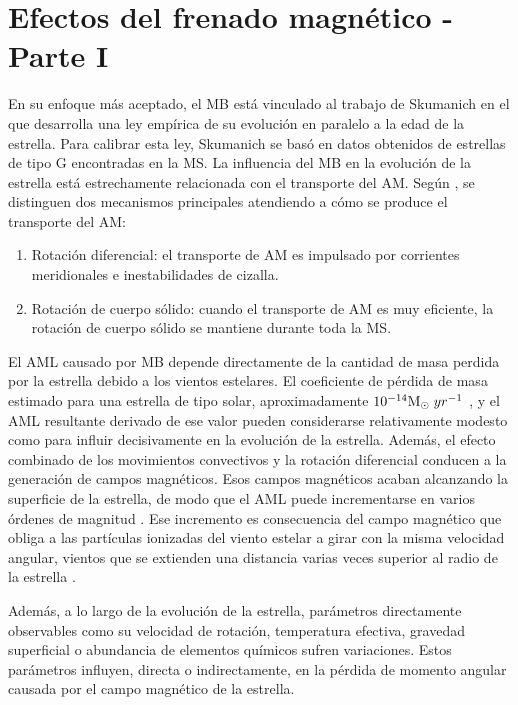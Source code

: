 \section{Efectos del frenado magnético - Parte I}
En su enfoque más aceptado, el MB está vinculado al trabajo de Skumanich \citep{Skumanich1972} en el que desarrolla una ley empírica de su evolución en paralelo a la edad de la estrella. Para calibrar esta ley, Skumanich se basó en datos obtenidos de estrellas de tipo G encontradas en la MS. La influencia del MB en la evolución de la estrella está estrechamente relacionada con el transporte del AM. Según \cite{Meynet2010}, se distinguen dos mecanismos principales atendiendo a cómo se produce el transporte del AM:

\begin{enumerate}
    \item Rotación diferencial: el transporte de AM es impulsado por corrientes meridionales e inestabilidades de cizalla.
    \item Rotación de cuerpo sólido: cuando el transporte de AM es muy eficiente, la rotación de cuerpo sólido se mantiene durante toda la MS.
\end{enumerate}

El AML causado por MB depende directamente de la cantidad de masa perdida por la estrella debido a los vientos estelares. El coeficiente de pérdida de masa estimado para una estrella de tipo solar, aproximadamente $10^{-14}\mathrm{M}_\odot \; yr^{-1}$ \citep{Noerdlinger2008}, y el AML resultante derivado de ese valor pueden considerarse relativamente modesto como para influir decisivamente en la evolución de la estrella. Además, el efecto combinado de los movimientos convectivos y la rotación diferencial conducen a la generación de campos magnéticos. Esos campos magnéticos acaban alcanzando la superficie de la estrella, de modo que el AML puede incrementarse en varios órdenes de magnitud \citep{Langer2012}. Ese incremento es consecuencia del campo magnético que obliga a las partículas ionizadas del viento estelar a girar con la misma velocidad angular, vientos que se extienden una distancia varias veces superior al radio de la estrella \citep[ver][para más detalles]{UdDoula2002,Ud-Doula2007,Ud-Doula2008}.\par

Además, a lo largo de la evolución de la estrella, parámetros directamente observables como su velocidad de rotación, temperatura efectiva, gravedad superficial o abundancia de elementos químicos sufren variaciones. Estos parámetros influyen, directa o indirectamente, en la pérdida de momento angular causada por el campo magnético de la estrella.\par



